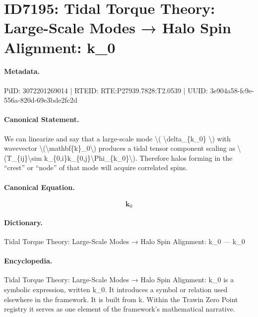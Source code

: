 \section*{ID7195: Tidal Torque Theory: Large-Scale Modes → Halo Spin Alignment: k\_0}
\paragraph{Metadata.}
PiID: 3072201269014 | RTEID: RTE:P27939.7828:T2.0539 | UUID: 3e904a58-fc9e-556a-820d-69e3bde2fc2d

\paragraph{Canonical Statement.}
We can linearize and say that a large-scale mode \textbackslash{}( \textbackslash{}delta\_\{k\_0\} \textbackslash{}) with wavevector \textbackslash{}(\textbackslash{}mathbf\{k\}\_0\textbackslash{}) produces a tidal tensor component scaling as \textbackslash{}(T\_\{ij\}\textbackslash{}sim k\_\{0,i\}k\_\{0,j\}\textbackslash{}Phi\_\{k\_0\}\textbackslash{}). Therefore halos forming in the “crest” or “node” of that mode will acquire correlated spins.

\paragraph{Canonical Equation.}
\[
\mathbf{k}_0
\]

\paragraph{Dictionary.}
Tidal Torque Theory: Large-Scale Modes → Halo Spin Alignment: k\_0 — k\_0

\paragraph{Encyclopedia.}
Tidal Torque Theory: Large-Scale Modes → Halo Spin Alignment: k\_0 is a symbolic expression, written k\_0. It introduces a symbol or relation used elsewhere in the framework. It is built from k. Within the Trawin Zero Point registry it serves as one element of the framework's mathematical narrative.
